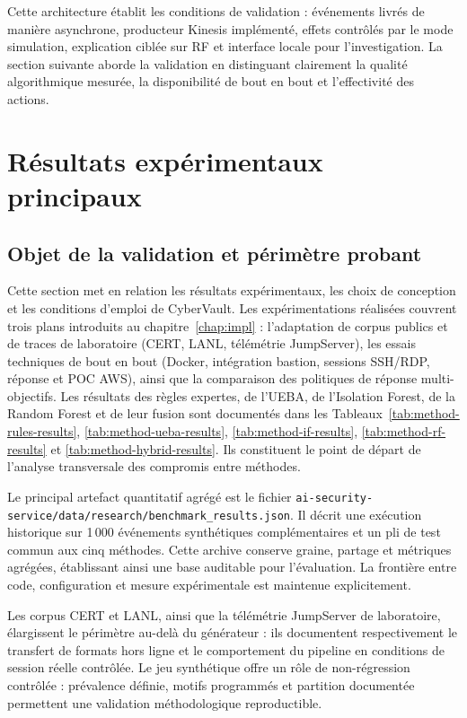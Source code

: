 \documentclass[11pt,a4paper,oneside]{report}
\theoremstyle{definition}
\theoremstyle{plain}
\begin{document}
Cette architecture établit les conditions de validation : événements livrés de
manière asynchrone, producteur Kinesis implémenté, effets contrôlés par le
mode simulation, explication ciblée sur RF et interface locale pour
l'investigation. La section suivante aborde la validation en distinguant
clairement la qualité algorithmique mesurée, la disponibilité de bout en bout
et l'effectivité des actions.



\section{Résultats expérimentaux principaux}

\subsection{Objet de la validation et périmètre probant}
\label{sec:validation-scope}

Cette section met en relation les résultats expérimentaux, les choix de
conception et les conditions d'emploi de CyberVault. Les expérimentations
réalisées couvrent trois plans introduits au chapitre~\ref{chap:impl} :
l'adaptation de corpus publics et de traces de laboratoire (CERT, LANL,
télémétrie JumpServer), les essais techniques de bout en bout (Docker,
intégration bastion, sessions SSH/RDP, réponse et POC AWS), ainsi que la
comparaison des politiques de réponse multi-objectifs. Les résultats des
règles expertes, de l'UEBA, de l'Isolation Forest, de la Random Forest et de
leur fusion sont documentés dans les
Tableaux~\ref{tab:method-rules-results}, \ref{tab:method-ueba-results},
\ref{tab:method-if-results}, \ref{tab:method-rf-results} et
\ref{tab:method-hybrid-results}. Ils constituent le point de départ de
l'analyse transversale des compromis entre méthodes.

Le principal artefact quantitatif agrégé est le fichier
\texttt{ai-security-service/data/research/benchmark\_results.json}. Il décrit
une exécution historique sur 1\,000 événements synthétiques complémentaires et
un pli de test commun aux cinq méthodes. Cette archive conserve graine,
partage et métriques agrégées, établissant ainsi une base auditable pour
l'évaluation. La frontière entre code, configuration et mesure expérimentale
est maintenue explicitement.

Les corpus CERT et LANL, ainsi que la télémétrie JumpServer de laboratoire,
élargissent le périmètre au-delà du générateur : ils documentent
respectivement le transfert de formats hors ligne et le comportement du
pipeline en conditions de session réelle contrôlée. Le jeu synthétique offre
un rôle de non-régression contrôlée : prévalence définie, motifs programmés et
partition documentée permettent une validation méthodologique reproductible.
\end{document}
